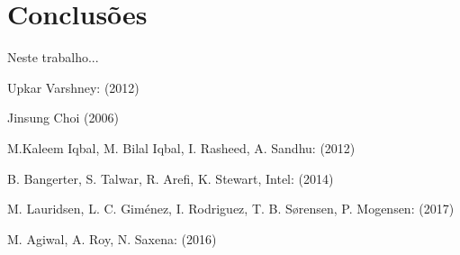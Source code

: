 \documentclass{llncs}
\begin{document}
\section{Conclusões}

Neste trabalho...

%

\begin{thebibliography}{1}

Upkar Varshney:
 (2012)

Jinsung Choi
 (2006)

M.Kaleem Iqbal, M. Bilal Iqbal, I. Rasheed, A. Sandhu:
 (2012)

B. Bangerter, S. Talwar, R. Arefi, K. Stewart, Intel:
 (2014)

M. Lauridsen, L. C. Giménez, I. Rodriguez, T. B. Sørensen, P. Mogensen:
 (2017)

M. Agiwal, A. Roy, N. Saxena:
 (2016)

\end{thebibliography}
\end{document}
